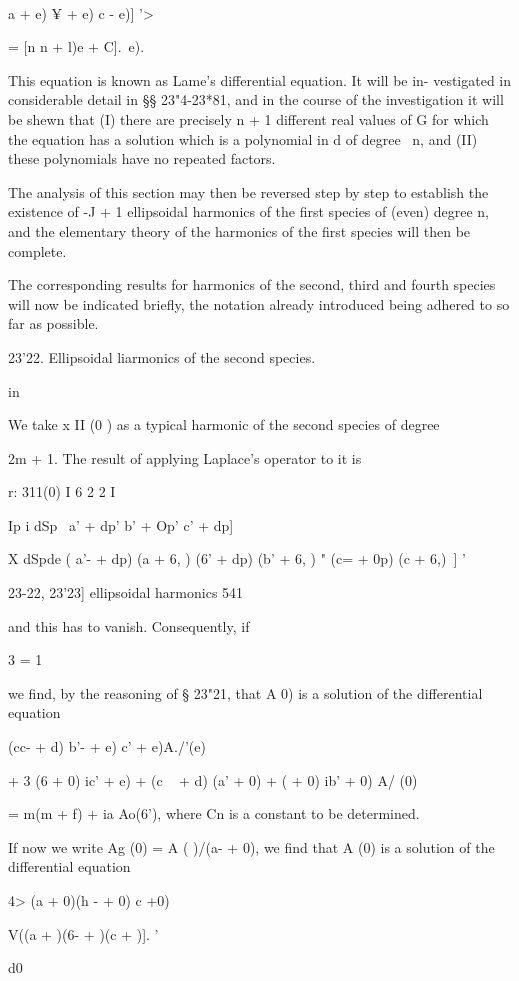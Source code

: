  \ \ {a + e) ¥ + e) c - e)] '>

= [n n + l)e + C].\, e).

This equation is known as Lame's differential equation. It will be in-
vestigated in considerable detail in §§ 23"4-23*81, and in the course
of the investigation it will be shewn that (I) there are precisely n +
1 different real values of G for which the equation has a solution
which is a polynomial in d of degree \ n, and (II) these polynomials
have no repeated factors.

The analysis of this section may then be reversed step by step to
establish the existence of -J + 1 ellipsoidal harmonics of the first
species of (even) degree n, and the elementary theory of the harmonics
of the first species will then be complete.

The corresponding results for harmonics of the second, third and
fourth species will now be indicated briefly, the notation already
introduced being adhered to so far as possible.

23'22. Ellipsoidal liarmonics of the second species.

in

We take x II (0 ) as a typical harmonic of the second species of
degree

2m + 1. The result of applying Laplace's operator to it is

r: 311(0) I 6 2 2 I

 Ip i dSp \ a' + dp' b' + Op' c' + dp]

   X dSpde ( a'- + dp) (a + 6, ) (6' + dp) (b' + 6, ) " (c= + 0p) (c +
6,)\ ] '

23-22, 23'23] ellipsoidal harmonics 541

and this has to vanish. Consequently, if

3 = 1

we find, by the reasoning of § 23"21, that A 0) is a solution of the
differential equation

(cc- + d) b'- + e) c' + e)A./'(e)

+ 3 (6 + 0) ic' + e) + (c ~ + d) (a' + 0) + ( + 0) ib' + 0) A/ (0)

= m(m + f) + ia Ao(6'), where Cn is a constant to be determined.

If now we write Ag (0) = A ( )/\/(a- + 0), we find that A (0) is a
solution of the differential equation

4> (a + 0)(h - + 0) c +0)

V((a + )(6- + )(c + )]. '

d0

}
